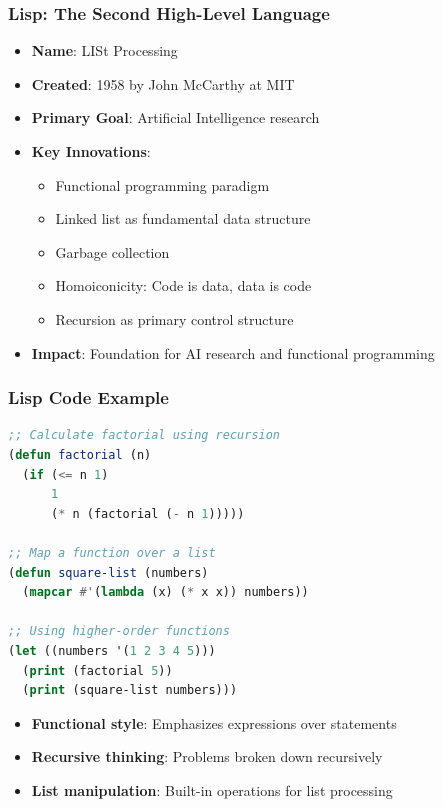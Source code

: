 \documentclass{beamer}
\begin{document}
\begin{frame}[t]
\frametitle{Lisp: The Second High-Level Language}
\begin{itemize}
    \item \textbf{Name}: LISt Processing
    \item \textbf{Created}: 1958 by John McCarthy at MIT
    \item \textbf{Primary Goal}: Artificial Intelligence research
    \item \textbf{Key Innovations}:
    \begin{itemize}
        \item Functional programming paradigm
        \item Linked list as fundamental data structure
        \item Garbage collection
        \item Homoiconicity: Code is data, data is code
        \item Recursion as primary control structure
    \end{itemize}
    \item \textbf{Impact}: Foundation for AI research and functional programming
\end{itemize}

\end{frame}

\begin{frame}[fragile,t]
\frametitle{Lisp Code Example}
\scriptsize
\begin{lstlisting}[language=Lisp, caption=Common Lisp Style]
;; Calculate factorial using recursion
(defun factorial (n)
  (if (<= n 1)
      1
      (* n (factorial (- n 1)))))

;; Map a function over a list
(defun square-list (numbers)
  (mapcar #'(lambda (x) (* x x)) numbers))

;; Using higher-order functions
(let ((numbers '(1 2 3 4 5)))
  (print (factorial 5))
  (print (square-list numbers)))
\end{lstlisting}

\begin{itemize}
    \item \textbf{Functional style}: Emphasizes expressions over statements
    \item \textbf{Recursive thinking}: Problems broken down recursively
    \item \textbf{List manipulation}: Built-in operations for list processing
\end{itemize}
\end{frame}
\end{document}
